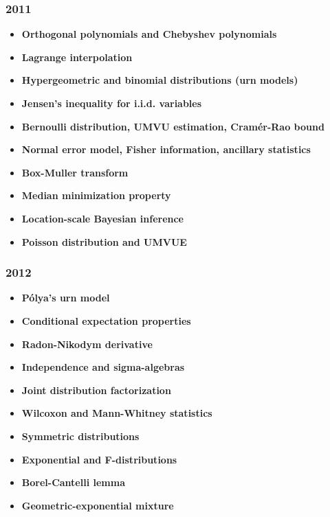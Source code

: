 \subsubsection*{2011}
\begin{itemize}
    \item \textbf{Orthogonal polynomials and Chebyshev polynomials}
    \item \textbf{Lagrange interpolation}
    \item \textbf{Hypergeometric and binomial distributions (urn models)}
    \item \textbf{Jensen's inequality for i.i.d. variables}
    \item \textbf{Bernoulli distribution, UMVU estimation, Cram\'er-Rao bound}
    \item \textbf{Normal error model, Fisher information, ancillary statistics}
    \item \textbf{Box-Muller transform}
    \item \textbf{Median minimization property}
    \item \textbf{Location-scale Bayesian inference}
    \item \textbf{Poisson distribution and UMVUE}
\end{itemize}

\subsubsection*{2012}
\begin{itemize}
    \item \textbf{P\'olya's urn model}
    \item \textbf{Conditional expectation properties}
    \item \textbf{Radon-Nikodym derivative}
    \item \textbf{Independence and sigma-algebras}
    \item \textbf{Joint distribution factorization}
    \item \textbf{Wilcoxon and Mann-Whitney statistics}
    \item \textbf{Symmetric distributions}
    \item \textbf{Exponential and F-distributions}
    \item \textbf{Borel-Cantelli lemma}
    \item \textbf{Geometric-exponential mixture}
\end{itemize}

